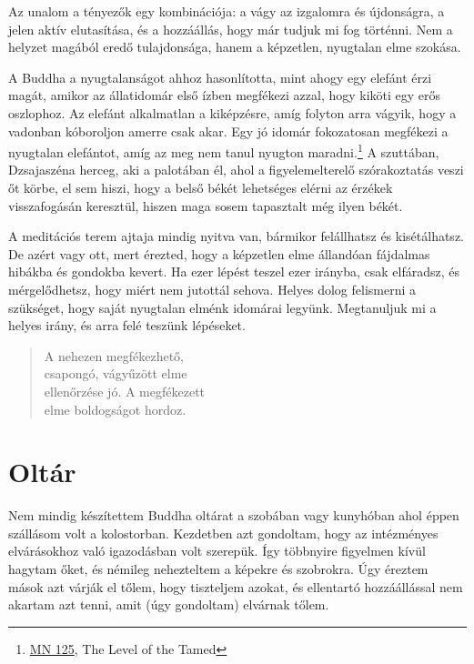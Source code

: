 Az unalom a tényezők egy kombinációja: a vágy az izgalomra és
újdonságra, a jelen aktív elutasítása, és a hozzáállás, hogy már tudjuk
mi fog történni. Nem a helyzet magából eredő tulajdonsága, hanem a
képzetlen, nyugtalan elme szokása.

A Buddha a nyugtalanságot ahhoz hasonlította, mint ahogy egy elefánt
érzi magát, amikor az állatidomár első ízben megfékezi azzal, hogy
kiköti egy erős oszlophoz. Az elefánt alkalmatlan a kiképzésre, amíg
folyton arra vágyik, hogy a vadonban kóboroljon amerre csak akar. Egy jó
idomár fokozatosan megfékezi a nyugtalan elefántot, amíg az meg nem
tanul nyugton maradni.\footnote{\href{https://suttacentral.net/mn125}{MN
  125}, The Level of the Tamed} A szuttában, Dzsajaszéna herceg, aki a
palotában él, ahol a figyelemelterelő szórakoztatás veszi őt körbe, el
sem hiszi, hogy a belső békét lehetséges elérni az érzékek visszafogásán
keresztül, hiszen maga sosem tapasztalt még ilyen békét.

A meditációs terem ajtaja mindig nyitva van, bármikor felállhatsz és
kisétálhatsz. De azért vagy ott, mert érezted, hogy a képzetlen elme
állandóan fájdalmas hibákba és gondokba kevert. Ha ezer lépést teszel
ezer irányba, csak elfáradsz, és mérgelődhetsz, hogy miért nem jutottál
sehova. Helyes dolog felismerni a szükséget, hogy saját nyugtalan elménk
idomárai legyünk. Megtanuljuk mi a helyes irány, és arra felé teszünk
lépéseket.

\begin{quote}
A nehezen megfékezhető,\\
csapongó, vágyűzött elme\\
ellenőrzése jó. A megfékezett\\
elme boldogságot hordoz.

\bigskip

\end{quote}

\section{Oltár}


\noindent Nem mindig készítettem Buddha oltárat a szobában vagy
kunyhóban ahol éppen szállásom volt a kolostorban. Kezdetben azt
gondoltam, hogy az intézményes elvárásokhoz való igazodásban volt
szerepük. Így többnyire figyelmen kívül hagytam őket, és némileg
nehezteltem a képekre és szobrokra. Úgy éreztem mások azt várják el
tőlem, hogy tiszteljem azokat, és ellentartó hozzáállással nem akartam
azt tenni, amit (úgy gondoltam) elvárnak tőlem.

